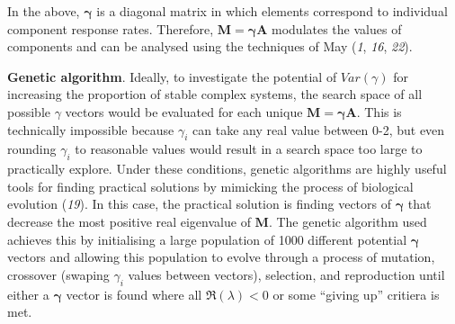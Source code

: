 \documentclass[]{article}
\begin{document}
In the above, \(\mathbf{\gamma}\) is a diagonal matrix in which elements
correspond to individual component response rates. Therefore,
\(\mathbf{M} =\mathbf{\gamma} \mathbf{A}\) modulates the values of
components and can be analysed using the techniques of May (\emph{1},
\emph{16}, \emph{22}).

\textbf{Genetic algorithm}. Ideally, to investigate the potential of
\(Var(\gamma)\) for increasing the proportion of stable complex systems,
the search space of all possible \(\gamma\) vectors would be evaluated
for each unique \(\mathbf{M = \gamma A}\). This is technically
impossible because \(\gamma_{i}\) can take any real value between 0-2,
but even rounding \(\gamma_{i}\) to reasonable values would result in a
search space too large to practically explore. Under these conditions,
genetic algorithms are highly useful tools for finding practical
solutions by mimicking the process of biological evolution (\emph{19}).
In this case, the practical solution is finding vectors of
\(\mathbf{\gamma}\) that decrease the most positive real eigenvalue of
\(\mathbf{M}\). The genetic algorithm used achieves this by initialising
a large population of 1000 different potential \(\mathbf{\gamma}\)
vectors and allowing this population to evolve through a process of
mutation, crossover (swaping \(\gamma_{i}\) values between vectors),
selection, and reproduction until either a \(\mathbf{\gamma}\) vector is
found where all \(\Re(\lambda) < 0\) or some ``giving up'' critiera is
met.
\end{document}
